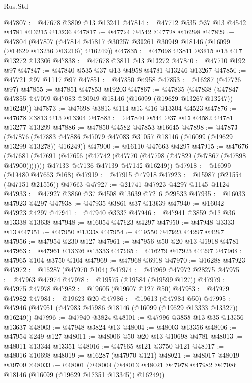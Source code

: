 \begin{lexlean}{RustStd}
\begin{coremodule}
@47807 := @47678 @3809 @13 @13241
@47814 := @47712 @535 @37 @13 @4542 @4781 @13215 @13236
@47817 := @47724 @4542 @47728 @16298
@47829 := @47804
    (@47807 (@47814 @47817 @30257 @30261 @30949 @18146 (@16099 (@19629 @13236 @13216)) @16249))
@47835 := @47698 @3811 @3815 @13 @17 @13272 @13306
@47838 := @47678 @3811 @13 @13272
@47840 := @47710 @192 @97
@47847 := @47840 @535 @37 @13 @4958 @4781 @13246 @13267
@47850 := @47721 @97 @1117 @97
@47851 := @47850 @4958
@47853 := @16287 (@47726 @97)
@47855 := @47851 @47853 @19203
@47867 := @47835
    (@47838 (@47847 @47855 @47079 @47083 @30949 @18146 (@16099 (@19629 @13267 @13247)) @16249))
@47873 := @47698 @3813 @114 @13 @16 @13304 @4523
@47876 := @47678 @3813 @13 @13304
@47883 := @47840 @544 @37 @13 @4582 @4781 @13277 @13299
@47886 := @47850 @4582 @47853 @16645
@47898 := @47873
    (@47876 (@47883 @47886 @47079 @47083 @31057 @18146 (@16099 (@19629 @13299 @13278)) @16249))
@47900 := @16110 @47663 @4297
@47915 := @47676
    (@47681
      (@47691
        (@47696 (@47742 (@47770 (@47798 (@47829 (@47867 (@47898 @47900)))))))
        @47133
        @47136
        @47139
        @47142
        @16249))
@47918 := @16099 (@19480 @47663 @168)
@47919 := @47915 @47918
@47923 := @15987 (@21554 (@47151 @21556)) @47663
@47927 := @21741 @47923 @4297 @1145 @1124
@47933 := @47927 @3860 @37 @4508 @13639 @7216 @29533
@47935 := @16033 @47923 @4297
@47938 := @47935 @3860 @37 @13639
@47940 := @16042 @47923 @4297
@47941 := @47940 @3333
@47946 := @47941 @3859 @13 @36 @13338 @13638
@47948 := @16054 @47923 @4297
@47950 := @47948 @3333 @13
@47951 := @47950 @13338
@47954 := @19550 @47923 @4297 @4297
@47956 := @47954 @230 @127
@47961 := @47956 @50 @20 @13 @6918 @4781
@47963 := @47961 @13326 @13333
@47965 := @16279 @47923 @4297
@47968 := @47965 @104 @3750 @104
@47969 := @47968 @6918
@47970 := @16288 @47923
@47972 := @16287 (@47970 @104)
@47974 := @47969 @47972 @28275
@47975 := @47963 @47974
@47978 := @19575 (@19584 (@19599 @127))
@47979 := @47975 @47978
@47982 := @19605 (@19607 @127 @50)
@47983 := @47979 @47982
@47984 := @19623 @20
@47986 := @19613 (@47984 @50)
@47995 := @47946 (@47951 (@47983 @47986 @18146 (@16099 (@19629 @13333 @13327)) @16249))
@47996 := @47940 @3824
@48001 := @47996 @3858 @13 @35 @13356 @13637
@48003 := @47948 @3824 @13
@48004 := @48003 @13356
@48006 := @47954 @249 @127
@48011 := @48006 @50 @20 @13 @10698 @4781
@48013 := @48011 @13344 @13351
@48016 := @47965 @121 @3750 @121
@48017 := @48016 @10698
@48019 := @16287 (@47970 @121)
@48021 := @48017 @48019 @39709
@48033 := @48001
    (@48004 (@48013 @48021 @47978 @47982 @47986 @18146 (@16099 (@19629 @13351 @13345)) @16249))

\end{coremodule}
\end{lexlean}
